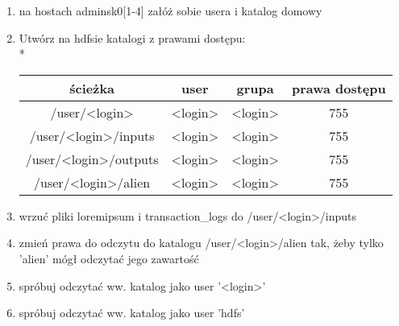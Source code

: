 \documentclass[11pt]{article}
\begin{document}
\begin{enumerate}
\item na hostach adminsk0[1-4] załóż sobie usera i katalog domowy
\item Utwórz na hdfsie katalogi z prawami dostępu:\\*

\begin{tabular}{c | c | c | c}
	ścieżka & user & grupa & prawa dostępu \\ \hline 
	/user/<login> & <login> & <login> & 755 \\
	/user/<login>/inputs & <login> & <login> & 755 \\
	/user/<login>/outputs & <login> & <login> & 755 \\
	/user/<login>/alien & <login> & <login> & 755 \\
\end{tabular}

\item wrzuć pliki loremipsum i transaction\_logs do /user/<login>/inputs
\item zmień prawa do odczytu do katalogu /user/<login>/alien tak, żeby tylko 'alien' mógł odczytać jego zawartość
\item spróbuj odczytać ww. katalog jako user ’<login>’
\item spróbuj odczytać ww. katalog jako user ’hdfs’
\end{enumerate}
\end{document}
